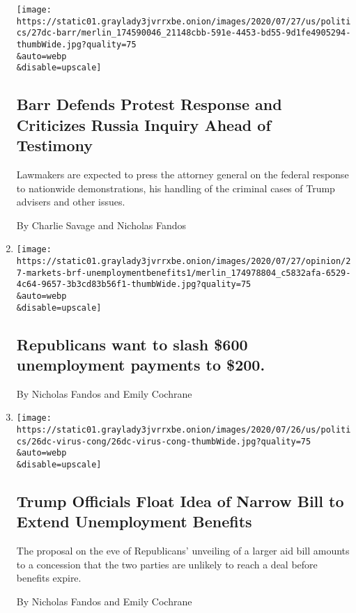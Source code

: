 \begin{enumerate}
  \texttt{[image: https://static01.graylady3jvrrxbe.onion/images/2020/07/27/us/politics/27dc-barr/merlin\_174590046\_21148cbb-591e-4453-bd55-9d1fe4905294-thumbWide.jpg?quality=75\\\&auto=webp\\\&disable=upscale]}

  \hypertarget{barr-defends-protest-response-and-criticizes-russia-inquiry-ahead-of-testimony}{%
  \subsection{Barr Defends Protest Response and Criticizes Russia
  Inquiry Ahead of
  Testimony}\label{barr-defends-protest-response-and-criticizes-russia-inquiry-ahead-of-testimony}}

  Lawmakers are expected to press the attorney general on the federal
  response to nationwide demonstrations, his handling of the criminal
  cases of Trump advisers and other issues.

  By Charlie Savage and Nicholas Fandos
\item
  \href{/live/2020/07/27/business/stock-market-today-coronavirus/republicans-want-to-slash-600-unemployment-payments-to-200}{}

  \texttt{[image: https://static01.graylady3jvrrxbe.onion/images/2020/07/27/opinion/27-markets-brf-unemploymentbenefits1/merlin\_174978804\_c5832afa-6529-4c64-9657-3b3cd83b56f1-thumbWide.jpg?quality=75\\\&auto=webp\\\&disable=upscale]}

  \hypertarget{republicans-want-to-slash-600-unemployment-payments-to-200}{%
  \subsection{Republicans want to slash \$600 unemployment payments to
  \$200.}\label{republicans-want-to-slash-600-unemployment-payments-to-200}}

  By Nicholas Fandos and Emily Cochrane
\item
  \href{/2020/07/26/us/politics/coronavirus-stimulus-bill-unemployment.html}{}

  \texttt{[image: https://static01.graylady3jvrrxbe.onion/images/2020/07/26/us/politics/26dc-virus-cong/26dc-virus-cong-thumbWide.jpg?quality=75\\\&auto=webp\\\&disable=upscale]}

  \hypertarget{trump-officials-float-idea-of-narrow-bill-to-extend-unemployment-benefits}{%
  \subsection{Trump Officials Float Idea of Narrow Bill to Extend
  Unemployment
  Benefits}\label{trump-officials-float-idea-of-narrow-bill-to-extend-unemployment-benefits}}

  The proposal on the eve of Republicans' unveiling of a larger aid bill
  amounts to a concession that the two parties are unlikely to reach a
  deal before benefits expire.

  By Nicholas Fandos and Emily Cochrane
\end{enumerate}

